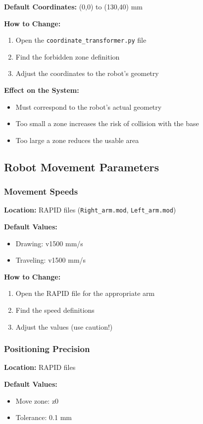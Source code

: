 \documentclass[a4paper,12pt]{article}
\begin{document}
\textbf{Default Coordinates:} (0,0) to (130,40) mm

\textbf{How to Change:}
\begin{enumerate}
\item Open the \texttt{coordinate\_transformer.py} file
\item Find the forbidden zone definition
\item Adjust the coordinates to the robot's geometry
\end{enumerate}

\textbf{Effect on the System:}
\begin{itemize}
\item Must correspond to the robot's actual geometry
\item Too small a zone increases the risk of collision with the base
\item Too large a zone reduces the usable area
\end{itemize}

\subsection{Robot Movement Parameters}

\subsubsection{Movement Speeds}
\textbf{Location:} RAPID files (\texttt{Right\_arm.mod}, \texttt{Left\_arm.mod})

\textbf{Default Values:}
\begin{itemize}
\item Drawing: v1500 mm/s
\item Traveling: v1500 mm/s
\end{itemize}

\textbf{How to Change:}
\begin{enumerate}
\item Open the RAPID file for the appropriate arm
\item Find the speed definitions
\item Adjust the values (use caution!)
\end{enumerate}

\subsubsection{Positioning Precision}
\textbf{Location:} RAPID files

\textbf{Default Values:}
\begin{itemize}
\item Move zone: z0
\item Tolerance: 0.1 mm
\end{itemize}
\end{document}
